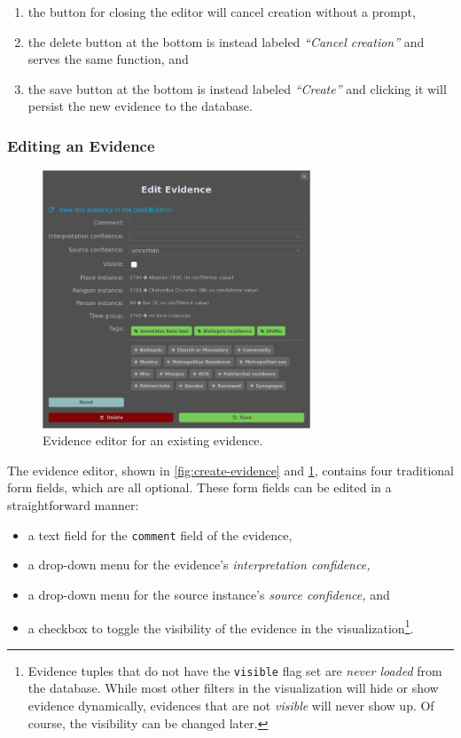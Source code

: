 \begin{enumerate}
  \item the button for closing the editor will cancel creation without a prompt,
  \item the delete button at the bottom is instead labeled \emph{\enquote{Cancel creation}} and serves the same function, and
  \item the save button at the bottom is instead labeled \emph{\enquote{Create}} and clicking it will persist the new evidence to the database.
\end{enumerate}


\subsubsection{Editing an Evidence}
\label{sec:evidence-editing}

\begin{figure}[htb]
  \centering
  \includegraphics[width=8cm]{../src/assets/annotator-documentation/edit-evidence.png}

  \caption{Evidence editor for an existing evidence.}
  \label{fig:edit-evidence}
\end{figure}

The evidence editor, shown in \cref{fig:create-evidence} and \cref{fig:edit-evidence}, contains four traditional form fields, which are all optional.
These form fields can be edited in a straightforward manner:

\begin{itemize}
  \item a text field for the \verb!comment! field of the evidence,
  \item a drop-down menu for the evidence's \emph{interpretation confidence,}
  \item a drop-down menu for the source instance's \emph{source confidence,} and
  \item a checkbox to toggle the visibility of the evidence in the visualization\footnote{
      Evidence tuples that do not have the \texttt{visible} flag set are \emph{never loaded} from the database.
      While most other filters in the visualization will hide or show evidence dynamically, evidences that are not \emph{visible} will never show up.
      Of course, the visibility can be changed later.
    }.
\end{itemize}

